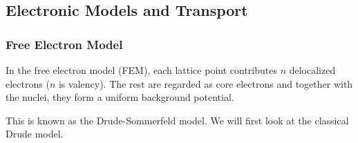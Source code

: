 \documentclass[a4paper]{article}
\begin{document}
\subsection{Electronic Models and Transport \cite{ashcroft1976solid,simon2013oxford}}
\subsubsection*{Free Electron Model}
\begin{Note}
In the free electron model (FEM), each lattice point contributes $n$ delocalized electrons ($n$ is valency). The rest are regarded as core electrons and together with the nuclei, they form a uniform background potential. 
\end{Note}
This is known as the Drude-Sommerfeld model. We will first look at the classical Drude model.
\end{document}
